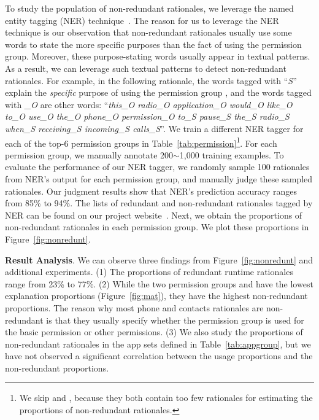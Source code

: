 To study the population of non-redundant rationales, we leverage the named entity tagging (NER) technique~\cite{conf/acl/FinkelGM05}. 
The reason for us to leverage the NER technique is our observation that non-redundant rationales usually use some words to state the more specific purposes than the fact of using the permission group. 
Moreover, these purpose-stating words usually appear in textual patterns. 
As a result, we can leverage such textual patterns to detect non-redundant rationales. 
For example, in the following rationale, the words tagged with ``\emph{S}'' explain the \emph{specific} purpose of using the permission group , and the words tagged with \emph{\_O} are other words: ``\emph{this\_O radio\_O application\_O would\_O like\_O to\_O use\_O the\_O phone\_O permission\_O to\_S pause\_S the\_S radio\_S when\_S receiving\_S incoming\_S calls\_S}''. We train a different NER tagger for each of the top-6 permission groups in Table~\ref{tab:permission}\footnote{We skip  and , because they both contain too few rationales for estimating the proportions of non-redundant rationales.}. 
For each permission group, we manually annotate 200$\sim$1,000 training examples.
To evaluate the performance of our NER tagger, we randomly sample 100 rationales from NER's output for each permission group, and manually judge these sampled rationales. 
Our judgment results show that NER's prediction accuracy ranges from 85\% to 94\%. The lists of redundant and non-redundant rationales tagged by NER can be found on our project website~\cite{runtimeproj}. 
Next, we obtain the proportions of non-redundant rationales in each permission group. We plot these proportions in Figure~\ref{fig:nonredunt}.

{\bf Result Analysis}. We can observe three findings from Figure~\ref{fig:nonredunt} and additional experiments. 
(1) The proportions of redundant runtime rationales range from 23\% to 77\%. 
(2) While the two permission groups  and  have the lowest explanation proportions (Figure~\ref{fig:mat}), they have the highest non-redundant proportions. 
The reason why most phone and contacts rationales are non-redundant is that they usually specify whether the permission group is used for the basic permission or other permissions. 
(3) We also study the proportions of non-redundant rationales in the app sets defined in Table~\ref{tab:appgroup}, 
but we have not observed a significant correlation between the usage proportions and the non-redundant proportions. 

